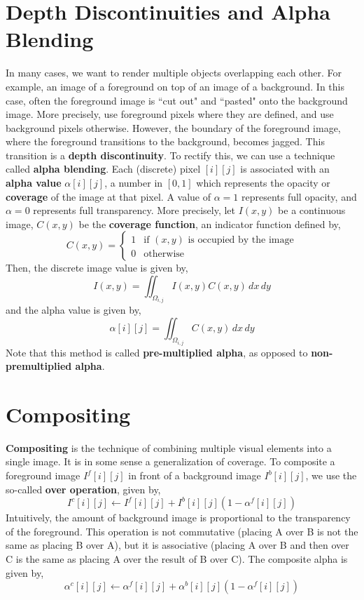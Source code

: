 \documentclass[letterpaper,12pt]{article}
\begin{document}
\section*{Depth Discontinuities and Alpha Blending}
In many cases, we want to render multiple objects overlapping each other. For example, an image of a foreground on top of an image of a background. In this case, often the foreground image is ``cut out" and ``pasted" onto the background image. More precisely, use foreground pixels where they are defined, and use background pixels otherwise. However, the boundary of the foreground image, where the foreground transitions to the background, becomes jagged. This transition is a \textbf{depth discontinuity}. To rectify this, we can use a technique called \textbf{alpha blending}. Each (discrete) pixel $[i][j]$ is associated with an \textbf{alpha value} $\alpha[i][j]$, a number in $[0,1]$ which represents the opacity or \textbf{coverage} of the image at that pixel. A value of $\alpha = 1$ represents full opacity, and $\alpha = 0$ represents full transparency. More precisely, let $I(x,y)$ be a continuous image, $C(x,y)$ be the \textbf{coverage function}, an indicator function defined by,
\begin{equation*}
    C(x,y) = \begin{cases} 1 & \text{if $(x,y)$ is occupied by the image} \\ 0 & \text{otherwise} \end{cases}
\end{equation*}
Then, the discrete image value is given by,
\begin{equation*}
    I(x,y) = \iint_{\Omega_{i,j}} I(x,y) C(x,y) \,dx \,dy
\end{equation*}
and the alpha value is given by,
\begin{equation*}
    \alpha[i][j] = \iint_{\Omega_{i,j}} C(x,y) \,dx \,dy
\end{equation*}
Note that this method is called \textbf{pre-multiplied alpha}, as opposed to \textbf{non-premultiplied alpha}.

\section*{Compositing}
\textbf{Compositing} is the technique of combining multiple visual elements into a single image. It is in some sense a generalization of coverage. To composite a foreground image $I^f[i][j]$ in front of a background image $I^b[i][j]$, we use the so-called \textbf{over operation}, given by,
\begin{equation*}
    I^c[i][j] \longleftarrow I^f[i][j] + I^b[i][j](1 - \alpha^f[i][j])
\end{equation*}
Intuitively, the amount of background image is proportional to the transparency of the foreground. This operation is not commutative (placing A over B is not the same as placing B over A), but it is associative (placing A over B and then over C is the same as placing A over the result of B over C). The composite alpha is given by,
\begin{equation*}
    \alpha^c[i][j] \longleftarrow \alpha^f[i][j] + \alpha^b[i][j](1 - \alpha^f[i][j])
\end{equation*}
\end{document}
